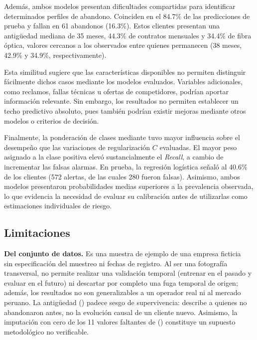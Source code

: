 Además, ambos modelos presentan dificultades compartidas para identificar determinados perfiles de abandono.
Coinciden en el 84.7\% de las predicciones de prueba y fallan en 61 abandonos (16.3\%).
Estos clientes presentan una antigüedad mediana de 35 meses, 44.3\% de contratos mensuales y 34.4\%
de fibra óptica, valores cercanos a los observados entre quienes permanecen (38 meses, 42.9\% y 34.9\%, respectivamente).

Esta similitud sugiere que las características disponibles no permiten distinguir fácilmente
dichos casos mediante los modelos evaluados. Variables adicionales, como reclamos, fallas
técnicas u ofertas de competidores, podrían aportar información relevante. Sin embargo,
los resultados no permiten establecer un techo predictivo absoluto, pues también podrían
existir mejoras mediante otros modelos o criterios de decisión.


Finalmente, la ponderación de clases mediante 
tuvo mayor influencia sobre el desempeño que las variaciones de regularización $C$ evaluadas.
El mayor peso asignado a la clase positiva elevó sustancialmente el \emph{Recall}, a cambio de
incrementar las falsas alarmas. En prueba, la regresión logística señaló al 40.6\% de los clientes
(572 alertas, de las cuales 280 fueron falsas).
Asimismo, ambos modelos presentaron probabilidades medias superiores a la prevalencia observada,
lo que evidencia la necesidad de evaluar su calibración antes de utilizarlas como estimaciones
individuales de riesgo.

\subsection{Limitaciones}
\textbf{Del conjunto de datos.} Es una muestra de ejemplo de una empresa ficticia~\cite{ibm} sin
especificación del muestreo ni fechas de registro. Al ser una fotografía transversal, no permite
realizar una validación temporal (entrenar en el pasado y evaluar en el futuro) ni descartar por
completo una fuga temporal de origen; además, los resultados no son generalizables a un operador
real ni al mercado peruano. La antigüedad () padece sesgo de supervivencia: describe a
quienes no abandonaron antes, no la evolución causal de un cliente nuevo. Asimismo, la imputación con
cero de los 11 valores faltantes de  () constituye un supuesto
metodológico no verificable.

